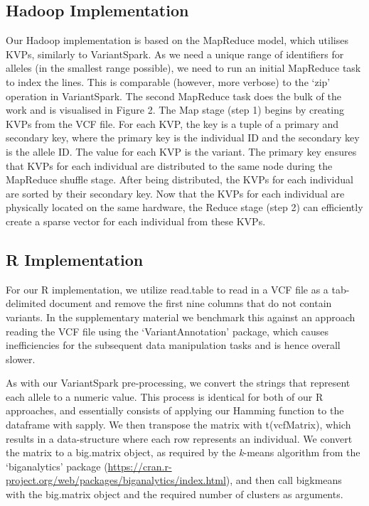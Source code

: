 \documentclass{bmcart}
\newcommand{\variantSpark}{{\sc VariantSpark}}
\newcommand{\kMeans}{\textit{k}-means}
\begin{document}
\subsection*{Hadoop Implementation}
Our Hadoop implementation is based on the MapReduce model, which utilises KVPs, similarly to \variantSpark{}.
As we need a unique range of identifiers for alleles (in the smallest range possible), we need to run an initial MapReduce task to index the lines. This is comparable (however, more verbose) to the `zip' operation in \variantSpark{}.
The second MapReduce task does the bulk of the work and is visualised in Figure 2. The Map stage (step 1) begins by creating KVPs from the VCF file. For each KVP, the key is a tuple of a primary and secondary key, where the primary key is the individual ID and the secondary key is the allele ID. The value for each KVP is the variant.
The primary key ensures that KVPs for each individual are distributed to the same node during the MapReduce shuffle stage. After being distributed, the KVPs for each individual are sorted by their secondary key.
Now that the KVPs for each individual are physically located on the same hardware, the Reduce stage (step 2) can efficiently create a sparse vector for each individual from these KVPs. 

\subsection*{R Implementation}
For our R implementation, we utilize {\sc read.table} to read in a VCF file as a tab-delimited document and remove the first nine columns that do not contain variants. 
In the supplementary material we benchmark this against an approach reading the VCF file using the `VariantAnnotation' package, which causes inefficiencies for the subsequent data manipulation tasks and is hence overall slower. 

As with our \variantSpark{} pre-processing, we convert the strings that represent each allele to a numeric value. This process is identical for both of our R approaches, and essentially consists
of applying our {\sc Hamming} function to the dataframe with {\sc sapply}.
We then transpose the matrix with {\sc t(vcfMatrix)}, which results in a data-structure where each row represents an individual. We convert the matrix to a {\sc big.matrix} object,
as required by the \kMeans{} algorithm from the `biganalytics' package (\url{https://cran.r-project.org/web/packages/biganalytics/index.html}), and then call {\sc bigkmeans} with
the {\sc big.matrix} object and the required number of clusters as arguments.
\end{document}
